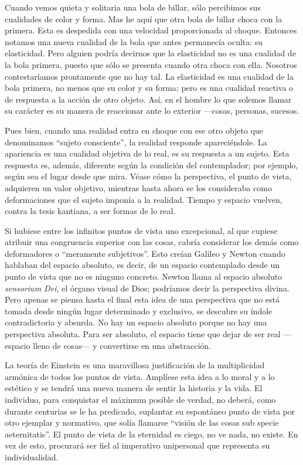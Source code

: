 \documentclass[a4paper, 12pt]{article}
\begin{document}
Cuando vemos quieta y solitaria una bola de billar, sólo percibimos sus
cualidades de color y forma. Mas he aquí que otra bola de billar choca con
la primera. Esta es despedida con una velocidad proporcionada al choque.
Entonces notamos una nueva cualidad de la bola que antes permanecía
oculta: su elasticidad. Pero alguien podría decirnos que la elasticidad no
es una cualidad de la bola primera, puesto que sólo se presenta cuando
otra choca con ella. Nosotros contestaríamos prontamente que no hay tal.
La elasticidad es una cualidad de la bola primera, no menos que su color y
su forma; pero es una cualidad reactiva o de respuesta a la acción de otro
objeto. Así, en el hombre lo que solemos llamar su carácter es su manera
de reaccionar ante lo exterior ---cosas, personas, sucesos.

Pues bien, cuando una realidad entra en choque con ese otro objeto que
denominamos ``sujeto consciente'', la realidad responde apareciéndole. La
apariencia es una cualidad objetiva de lo real, es su respuesta a un
sujeto. Esta respuesta es, además, diferente según la condición del
contemplador; por ejemplo, según sea el lugar desde que mira. Véase cómo
la perspectiva, el punto de vista, adquieren un valor objetivo, mientras
hasta ahora se los consideraba como deformaciones que el sujeto imponía a
la realidad. Tiempo y espacio vuelven, contra la tesis kantiana, a ser
formas de lo real.



Si hubiese entre los infinitos puntos de vista uno excepcional, al que
cupiese atribuir una congruencia superior con las cosas, cabría considerar
los demás como deformadores o ``meramente subjetivos''. Esto creían Galileo
y Newton cuando hablaban del espacio absoluto, es decir, de un espacio
contemplado desde un punto de vista que no es ninguno concreto. Newton
llama al espacio absoluto {\it sensorium Dei}, el órgano visual de Dios;
podríamos decir la perspectiva divina. Pero apenas se piensa hasta el
final esta idea de una perspectiva que no está tomada desde ningún lugar
determinado y exclusivo, se descubre su índole contradictoria y absurda.
No hay un espacio absoluto porque no hay una perspectiva absoluta. Para
ser absoluto, el espacio tiene que dejar de ser real ---espacio lleno de
cosas--- y convertirse en una abstracción.

La teoría de Einstein es una maravillosa justificación de la multiplicidad
armónica de todos los puntos de vista. Amplíese esta idea a lo moral y a
lo estético y se tendrá una nueva manera de sentir la historia y la vida.
El individuo, para conquistar el máximum posible de verdad, no deberá,
como durante centurias se le ha predicado, suplantar su espontáneo punto
de vista por otro ejemplar y normativo, que solía llamarse ``visión de las
cosas sub specie aeternitatis''. El punto de vista de la eternidad es
ciego, no ve nada, no existe. En vez de esto, procurará ser fiel al
imperativo unipersonal que representa su individualidad.
\end{document}
